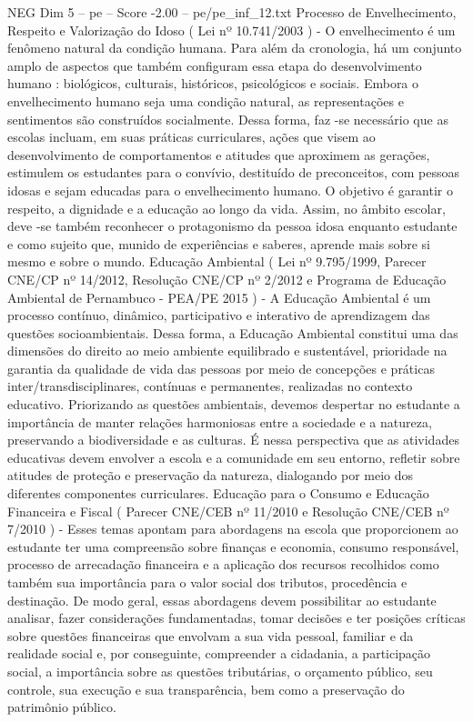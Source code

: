 \begin{textsample}{NEG Dim 5 – pe – Score -2.00 – pe/pe\_inf\_12.txt}
Processo de Envelhecimento, Respeito e Valorização do Idoso ( Lei nº 10.741/2003 ) - O envelhecimento é um fenômeno natural da condição humana.
Para além da cronologia, há um conjunto amplo de aspectos que também configuram essa etapa do desenvolvimento humano : biológicos, culturais, históricos, psicológicos e sociais.
Embora o envelhecimento humano seja uma condição natural, as representações e sentimentos são construídos socialmente.
Dessa forma, faz -se necessário que as escolas incluam, em suas práticas curriculares, ações que visem ao desenvolvimento de comportamentos e atitudes que aproximem as gerações, estimulem os estudantes para o convívio, destituído de preconceitos, com pessoas idosas e sejam educadas para o envelhecimento humano.
O objetivo é garantir o respeito, a dignidade e a educação ao longo da vida.
Assim, no âmbito escolar, deve -se também reconhecer o protagonismo da pessoa idosa enquanto estudante e como sujeito que, munido de experiências e saberes, aprende mais sobre si mesmo e sobre o mundo.
Educação Ambiental ( Lei nº 9.795/1999, Parecer CNE/CP nº 14/2012, Resolução CNE/CP nº 2/2012 e Programa de Educação Ambiental de Pernambuco - PEA/PE 2015 ) - A Educação Ambiental é um processo contínuo, dinâmico, participativo e interativo de aprendizagem das questões socioambientais.
Dessa forma, a Educação Ambiental constitui uma das dimensões do direito ao meio ambiente equilibrado e sustentável, prioridade na garantia da qualidade de vida das pessoas por meio de concepções e práticas inter/transdisciplinares, contínuas e permanentes, realizadas no contexto educativo.
Priorizando as questões ambientais, devemos despertar no estudante a importância de manter relações harmoniosas entre a sociedade e a natureza, preservando a biodiversidade e as culturas.
É nessa perspectiva que as atividades educativas devem envolver a escola e a comunidade em seu entorno, refletir sobre atitudes de proteção e preservação da natureza, dialogando por meio dos diferentes componentes curriculares.
Educação para o Consumo e Educação Financeira e Fiscal ( Parecer CNE/CEB nº 11/2010 e Resolução CNE/CEB nº 7/2010 ) - Esses temas apontam para abordagens na escola que proporcionem ao estudante ter uma compreensão sobre finanças e economia, consumo responsável, processo de arrecadação financeira e a aplicação dos recursos recolhidos como também sua importância para o valor social dos tributos, procedência e destinação.
De modo geral, essas abordagens devem possibilitar ao estudante analisar, fazer considerações fundamentadas, tomar decisões e ter posições críticas sobre questões financeiras que envolvam a sua vida pessoal, familiar e da realidade social e, por conseguinte, compreender a cidadania, a participação social, a importância sobre as questões tributárias, o orçamento público, seu controle, sua execução e sua transparência, bem como a preservação do patrimônio público.

\end{textsample}
